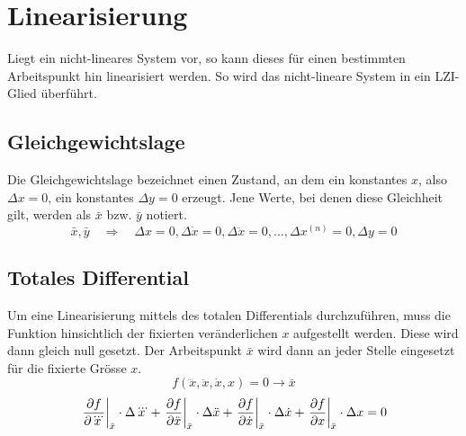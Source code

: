 \section{Linearisierung}
Liegt ein nicht-lineares System vor, so kann dieses für einen
bestimmten Arbeitspunkt hin linearisiert werden. So wird das
nicht-lineare System in ein LZI-Glied überführt.

\subsection{Gleichgewichtslage}
Die Gleichgewichtslage bezeichnet einen Zustand, an dem ein konstantes 
$x$, also $\Delta x = 0$, ein konstantes $\Delta y = 0$ erzeugt.
Jene Werte, bei denen diese Gleichheit gilt, werden als $\bar{x}$ 
bzw. $\bar{y}$ notiert.
\[  
    \bar{x}, \bar{y}
        \quad \Rightarrow \quad
        \Delta x = 0, 
        \Delta \dot{x} = 0,
        \Delta \ddot{x} = 0,    
        \dots,
        \Delta x^{(n)} = 0,
        \Delta y = 0
\]

\subsection{Totales Differential}
Um eine Linearisierung mittels des totalen Differentials durchzuführen,
muss die Funktion hinsichtlich der fixierten veränderlichen $x$ 
aufgestellt werden. Diese wird dann gleich null gesetzt. 
Der Arbeitspunkt $\bar{x}$ wird dann an jeder Stelle eingesetzt für die 
fixierte Grösse $x$. 
\[ 
    f(\dddot{x}, \ddot{x}, \dot{x}, x) = 0 \rightarrow \bar{x}
\]
\[ 
    \begin{array}{r l} 
		\displaystyle 
            \left. \frac{\partial f}{\partial \dddot{x}}
                \right\rvert_{\bar{x}} \cdot \Delta \dddot{x}
            + \left.\frac{\partial f}{\partial \ddot{x}}
                \right\rvert_{\bar{x}} \cdot \Delta \ddot{x}
            + \left.\frac{\partial f}{\partial \dot{x}}
                \right\rvert_{\bar{x}} \cdot \Delta \dot{x}
            + \left.\frac{\partial f}{\partial x}
                \right\rvert_{\bar{x}} \cdot \Delta x 
            = 0\\
    \end{array} 
\]


